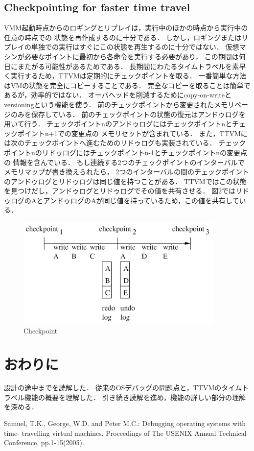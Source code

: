 \documentclass[12pt]{jsarticle}
\begin{document}
\subsection{Checkpointing for faster time travel}
VMM起動時点からのロギングとリプレイは，実行中のほかの時点から実行中の任意の時点での
状態を再作成するのに十分である．
しかし，ロギングまたはリプレイの単独での実行はすぐにこの状態を再生するのに十分ではない．
仮想マシンが必要なポイントに最初から各命令を実行する必要があり，
この期間は何日にまたがる可能性があるためである．
長期間にわたるタイムトラベルを素早く実行するため，TTVMは定期的にチェックポイントを取る．
一番簡単な方法はVMの状態を完全にコピーすることである．
完全なコピーを取ることは簡単であるが，効率的ではない．
オーバヘッドを削減するためにcopy-on-writeとversioningという機能を使う．
前のチェックポイントから変更されたメモリページのみを保存している．
前のチェックポイントの状態の復元はアンドゥログを用いて行う．
チェックポイントnのアンドゥログにはチェックポイントnとチェックポイントn+1での変更点の
メモリセットが含まれている．
また，TTVMには次のチェックポイントへ進むためのリドゥログも実装されている．
チェックポイントnのリドゥログにはチェックポイントn-1とチェックポイントnの変更点の
情報を含んでいる．
もし連続する2つのチェックポイントのインターバルでメモリマップが書き換えられたら，
2つのインターバルの間のチェックポイントのアンドゥログとリドゥログは同じ値を持つことがある．
TTVMではこの状態を見つけだし，アンドゥログとリドゥログでその値を共有させる．
図2ではリドゥログのAとアンドゥログのAが同じ値を持っているため，この値を共有している．

\begin{figure}[t]
\begin{center}
\includegraphics[height=5.5cm]{./fig1.jpg}          
\caption{Checkpoint}
\label{fig:up}
\end{center}
\end{figure}


\section{おわりに}
設計の途中までを読解した．
従来のOSデバッグの問題点と，TTVMのタイムトラベル機能の概要を理解した．
引き続き読解を進め，機能の詳しい部分の理解を深める．




\begin{thebibliography}{9}
 Samuel, T.K., George, W.D. and Peter M.C.: Debugging operating systems with time-
travelling virtual machines, Proceedings of The USENIX Annual Technical Conference,
pp.1-15(2005).
\end{thebibliography}
\end{document}
